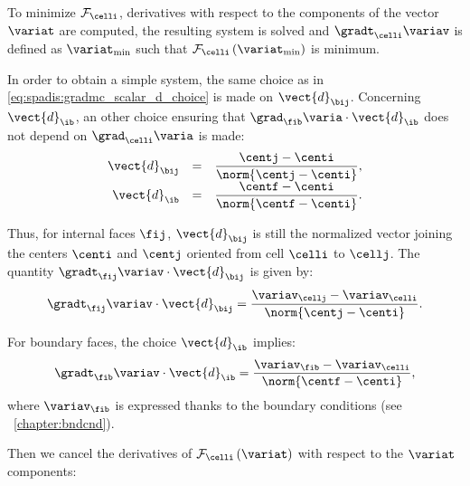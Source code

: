 To minimize $\mathcal{F}_{\celli}$, derivatives with respect to the components of the
vector $\variat$ are computed, the resulting system is solved and $\gradt_\celli \variav$ is defined
as $\variat_{\min}$ such that $\mathcal{F}_{\celli} \left( \variat_{\min}\right)$ is minimum.

In order to obtain a simple system, the same choice as in \eqref{eq:spadis:gradmc_scalar_d_choice} is made on $\vect{d}_{\bij}$.
Concerning $\vect{d}_\ib$, an other choice ensuring that $\grad_{\fib} \varia   \cdot \vect{d}_\ib $ does not
depend on $\grad_{\celli} \varia $ is made:
%
\begin{equation}\label{eq:spadis:gradmv_scalar_d_choice}
\begin{array}{r c l}
\vect{d}_{\bij} &=& \dfrac{\centj - \centi}{\norm{\centj - \centi}}, \\
\vect{d}_\ib &=& \dfrac{\centf - \centi}{\norm{\centf - \centi}} .
\end{array}
\end{equation}

Thus, for internal faces $\fij$, $\vect{d}_{\bij}$ is still the normalized vector joining
the centers $\centi$ and $\centj$ oriented from cell $\celli$ to $\cellj$.
The quantity  $\gradt_{\fij} \variav   \cdot \vect{d}_{\bij}$ is given by:
\begin{equation}
\gradt_{\fij} \variav   \cdot \vect{d}_{\bij} =\dfrac{\variav_{\cellj} - \variav_{\celli} }{\norm{\centj - \centi}}.
\end{equation}

For boundary faces, the choice $\vect{d}_\ib$ implies:
\begin{equation}
\gradt_{\fib} \variav   \cdot \vect{d}_\ib =\dfrac{\variav_{\fib} - \variav_{\celli} }{\norm{\centf - \centi}},
\end{equation}
where $\variav_{\fib}$ is expressed thanks to the boundary conditions (see \chaptername~\ref{chapter:bndcnd}).

Then we cancel the derivatives of
$\mathcal{F}_{\celli} \left( \variat \right)$ with respect to the $ \variat$ components:


